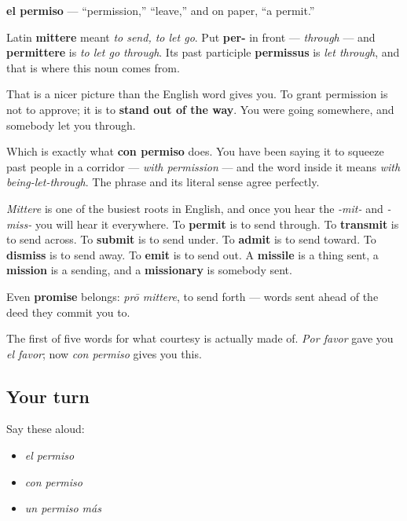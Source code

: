 \begin{cousinweb}
\textbf{el permiso} — \textquotedblleft{}permission,\textquotedblright{} \textquotedblleft{}leave,\textquotedblright{} and on paper, \textquotedblleft{}a permit.\textquotedblright{}

Latin \textbf{mittere} meant \emph{to send, to let go}. Put \textbf{per-} in front — \emph{through} — and \textbf{permittere} is \emph{to let go through}. Its past participle \textbf{permissus} is \emph{let through}, and that is where this noun comes from.

That is a nicer picture than the English word gives you. To grant permission is not to approve; it is to \textbf{stand out of the way}. You were going somewhere, and somebody let you through.

Which is exactly what \textbf{con permiso} does. You have been saying it to squeeze past people in a corridor — \emph{with permission} — and the word inside it means \emph{with being-let-through}. The phrase and its literal sense agree perfectly.

\emph{Mittere} is one of the busiest roots in English, and once you hear the \emph{-mit-} and \emph{-miss-} you will hear it everywhere. To \textbf{permit} is to send through. To \textbf{transmit} is to send across. To \textbf{submit} is to send under. To \textbf{admit} is to send toward. To \textbf{dismiss} is to send away. To \textbf{emit} is to send out. A \textbf{missile} is a thing sent, a \textbf{mission} is a sending, and a \textbf{missionary} is somebody sent.

Even \textbf{promise} belongs: \emph{prō mittere}, to send forth — words sent ahead of the deed they commit you to.
\end{cousinweb}

\begin{grammarlens}[title={What you've built}]
The first of five words for what courtesy is actually made of. \emph{Por favor} gave you \emph{el favor}; now \emph{con permiso} gives you this.
\end{grammarlens}

\subsection*{Your turn}
Say these aloud:

\begin{itemize}
\raggedright
  \item \emph{el permiso}
  \item \emph{con permiso}
  \item \emph{un permiso más}
\end{itemize}

